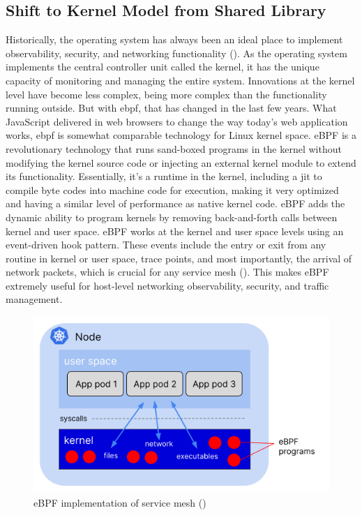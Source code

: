 \subsection{Shift to Kernel Model from Shared Library}
\label{lr:ebpf}
Historically, the operating system has always been an ideal place to implement observability, security, and networking functionality (\cite{ebpfIODocs}). As the operating system implements the central controller unit called the kernel, it has the unique capacity of monitoring and managing the entire system. Innovations at the kernel level have become less complex, being more complex than the functionality running outside. But with \acrshort{ebpf}, that has changed in the last few years. What JavaScript delivered in web browsers to change the way today's web application works, \acrshort{ebpf} is somewhat comparable technology for Linux kernel space. eBPF is a revolutionary technology that runs sand-boxed programs in the kernel without modifying the kernel source code or injecting an external kernel module to extend its functionality. Essentially, it's a runtime in the kernel, including a \acrshort{jit} to compile byte codes into machine code for execution, making it very optimized and having a similar level of performance as native kernel code. eBPF adds the dynamic ability to program kernels by removing back-and-forth calls between kernel and user space. eBPF works at the kernel and user space levels using an event-driven hook pattern. These events include the entry or exit from any routine in kernel or user space, trace points, and most importantly, the arrival of network packets, which is crucial for any service mesh (\cite{thenewstackRice2021}). This makes eBPF extremely useful for host-level networking observability, security, and traffic management.

\begin{figure}[ht!]
  \centering
  \includegraphics[width=0.65\linewidth]{resources/ebpf-service-mesh.png}
  \caption{eBPF implementation of service mesh (\cite{thenewstackRice2021})}
  \label{lr:ebpfDesign}
 \end{figure}


